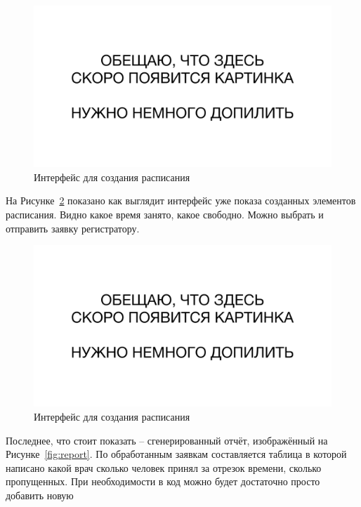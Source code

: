\documentclass[a4paper,article]{article}
\begin{document}
\begin{sloppypar}
    \begin{figure}[h]
        \centering
        \includegraphics[width=0.8\linewidth]{UI. Пример создания расписания.png}        
        \caption{\centering Интерфейс для создания расписания}        
        \label{fig:createsched}        
    \end{figure}
    
    \newpage
    
    На Рисунке~\ref{fig:dosched} показано как выглядит интерфейс уже показа созданных элементов расписания. Видно какое время занято, какое свободно. Можно выбрать и отправить заявку регистратору.
    
    \begin{figure}[h]
        \centering
        \includegraphics[width=0.8\linewidth]{UI. Пример создания расписания.png}        
        \caption{\centering Интерфейс для создания расписания}        
        \label{fig:dosched}
    \end{figure}
    
    Последнее, что стоит показать -- сгенерированный отчёт, изображённый на Рисунке~\ref{fig:report}. По обработанным заявкам составляется таблица в которой написано какой врач сколько человек принял за отрезок времени, сколько пропущенных. При необходимости в код можно будет достаточно просто добавить новую
    

\end{sloppypar}
\end{document}
